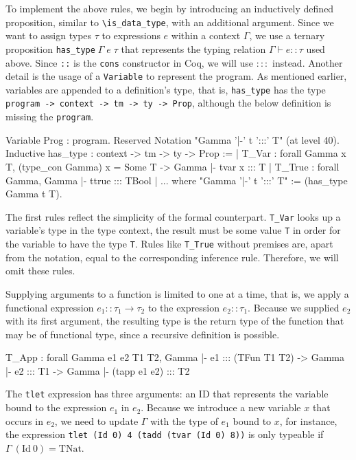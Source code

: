 \documentclass[paper = a4, fleqn, twoside]{scrreprt}
\newcommand{\coqinline}[1]{\texttt{#1}}
\begin{document}
\par \noindent
To implement the above rules, we begin by introducing an inductively defined proposition, similar to \texttt{\textbackslash is\_data\_type}, with an additional argument. Since we want to assign types $\tau$ to expressions $e$ within a context $\Gamma$, we use a ternary proposition \coqinline{has_type}$\; \Gamma \; e \; \tau$ that represents the typing relation $\Gamma \vdash e :: \tau$ used above. Since \coqinline{::} is the \coqinline{cons} constructor in Coq, we will use $:::$ instead. Another detail is the usage of a \coqinline{Variable} to represent the program. As mentioned earlier, variables are appended to a definition's type, that is, \coqinline{has_type} has the type \coqinline{program -> context -> tm -> ty -> Prop}, although the below definition is missing the \coqinline{program}.
\begin{coqcode}
Variable Prog : program.
Reserved Notation "Gamma '|-' t ':::' T" (at level 40).
Inductive has_type : context -> tm -> ty -> Prop :=
  | T_Var  : forall Gamma x T, (type_con Gamma) x = Some T ->
              Gamma |- tvar x ::: T
  | T_True : forall Gamma, Gamma |- ttrue ::: TBool
  | ...
where "Gamma '|-' t ':::' T" := (has_type Gamma t T).
\end{coqcode}
The first rules reflect the simplicity of the formal counterpart. \texttt{T\_Var} looks up a variable's type in the type context, the result must be some value \texttt{T} in order for the variable to have the type \texttt{T}. Rules like \texttt{T\_True} without premises are, apart from the notation, equal to the corresponding inference rule. Therefore, we will omit these rules.
\par
Supplying arguments to a function is limited to one at a time, that is, we apply a functional expression $e_{1} :: \tau_{1} \rightarrow \tau_{2}$ to the expression $e_{2} :: \tau_{1}$. Because we supplied $e_{2}$ with its first argument, the resulting type is the return type of the function that may be of functional type, since a recursive definition is possible.
\begin{coqcode}
T_App : forall Gamma e1 e2 T1 T2,
          Gamma |- e1 ::: (TFun T1 T2) -> Gamma |- e2 ::: T1 ->
          Gamma |- (tapp e1 e2) ::: T2
\end{coqcode}
The \coqinline{tlet} expression has three arguments: an ID that represents the variable bound to the expression $e_{1}$ in $e_{2}$. Because we introduce a new variable $x$ that occurs in $e_{2}$, we need to update $\Gamma$ with the type of $e_{1}$ bound to $x$, for instance, the expression \coqinline{tlet (Id 0) 4 (tadd (tvar (Id 0) 8))} is only typeable if $\Gamma \:(\text{Id}\: 0) = \text{TNat}$.
\end{document}

